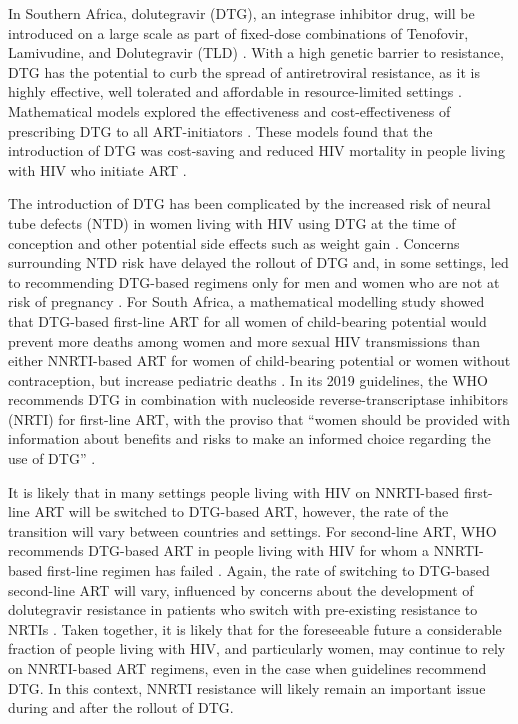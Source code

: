 \documentclass[10pt,letterpaper]{article}
\begin{document}
In Southern Africa, dolutegravir (DTG), an integrase inhibitor drug, will be introduced on a large scale as part of fixed-dose combinations of Tenofovir, Lamivudine, and Dolutegravir (TLD) \cite{SouthAfricaNationalDepartmentofHealth2018}. With a high genetic barrier to resistance, DTG has the potential to curb the spread of antiretroviral resistance, as it is highly effective, well tolerated and affordable in resource-limited settings \cite{Inzaule2019b,Goh2019,Tang2012,Venter2019}. Mathematical models explored the effectiveness and cost-effectiveness of prescribing DTG to all ART-initiators \cite{Phillips2018}. These models found that the introduction of DTG was cost-saving and reduced HIV mortality in people living with HIV who initiate ART \cite{Phillips2018}.

The introduction of DTG has been complicated by the increased risk of neural tube defects (NTD) in women living with HIV using DTG at the time of conception \cite{WHO_dtg} and other potential side effects such as weight gain \cite{Group2019,Venter2019}. Concerns surrounding NTD risk have delayed the rollout of DTG and, in some settings, led to recommending DTG-based regimens only for men and women who are not at risk of pregnancy \cite{Zash2019,dtg_saphra}. For South Africa, a mathematical modelling study showed that DTG-based first-line ART for all women of child-bearing potential would prevent more deaths among women and more sexual HIV transmissions than either NNRTI-based ART for women of child-bearing potential or women without contraception, but increase pediatric deaths \cite{Dugdale2019}. In its 2019 guidelines, the WHO recommends DTG in combination with nucleoside reverse-transcriptase inhibitors (NRTI) for first-line ART, with the proviso that “women should be provided with information about benefits and risks to make an informed choice regarding the use of DTG” \cite{WHO2019}. 

It is likely that in many settings people living with HIV on NNRTI-based first-line ART will be switched to DTG-based ART, however, the rate of the transition will vary between countries and settings. For second-line ART, WHO recommends DTG-based ART in people living with HIV for whom a NNRTI-based first-line regimen has failed \cite{WHO2019}. Again, the rate of switching to DTG-based second-line ART will vary, influenced by concerns about the development of dolutegravir resistance in patients who switch with pre-existing resistance to NRTIs \cite{Inzaule2019}. Taken together, it is likely that for the foreseeable  future a considerable fraction of people living with HIV, and particularly women, may continue to rely on NNRTI-based ART regimens, even in the case when guidelines recommend DTG. In this context, NNRTI resistance will likely remain an important issue during and after the rollout of DTG. 
\end{document}
